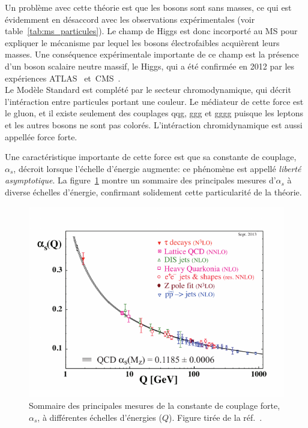 Un problème avec cette théorie est que les bosons sont sans masses, ce
qui est évidemment en désaccord avec les observations expérimentales
(voir table~\ref{tab:ms_particules}). Le champ de Higgs est donc
incorporté au MS pour expliquer le mécanisme par lequel les bosons
électrofaibles acquièrent leurs masses. Une conséquence expérimentale
importante de ce champ est la présence d'un boson scalaire neutre
massif, le Higgs, qui a été confirmée en 2012 par les
expériences ATLAS~\cite{aad_observation_2012} et~CMS~\cite{chatrchyan_observation_2012}. \\


Le Modèle Standard est complété par le secteur chromodynamique, qui
décrit l'intéraction entre particules portant une couleur. Le
médiateur de cette force est le gluon, et il existe seulement des
couplages qqg, ggg et gggg puisque les leptons et les autres bosons ne
sont pas colorés. L'intéraction chromidynamique est aussi appellée
force forte.

Une caractéristique importante de cette force est que sa
constante de couplage, $\alpha_s$, décroit lorsque l'échelle d'énergie
augmente: ce phénomène est appellé \emph{liberté asymptotique}. La
figure~\ref{fig:alpha_s} montre un sommaire des principales mesures
d'$\alpha_s$ à diverse échelles d'énergie, confirmant solidement cette
particularité de la théorie.

\begin{figure}
  \centering
  \includegraphics{alpha_s.pdf}
  \caption{Sommaire des principales mesures de la constante de couplage forte, $\alpha_s$, à différentes échelles d'énergies ($Q$). Figure tirée de la réf.~\cite{olive_review_2014}.}
\label{fig:alpha_s}
\end{figure}

